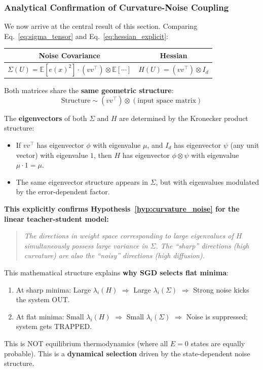 \documentclass[
  journal=largetwo,
  simfonts=false,
  year=2025,
  volume=37,
]{cup-journal}
\begin{document}
\subsubsection{Analytical Confirmation of Curvature-Noise Coupling}

We now arrive at the central result of this section. Comparing Eq.~\eqref{eq:sigma_tensor} and Eq.~\eqref{eq:hessian_explicit}:

\begin{center}
\begin{tabular}{|c|c|}
\hline
\textbf{Noise Covariance} & \textbf{Hessian} \\
\hline
$\Sigma(U) = \mathbb{E}[e(x)^2] \cdot (v v^\top) \otimes \mathbb{E}[\cdots]$ & $H(U) = (v v^\top) \otimes I_d$ \\
\hline
\end{tabular}
\end{center}

Both matrices share the \textbf{same geometric structure}:
\begin{equation}
    \text{Structure} \sim (v v^\top) \otimes (\text{input space matrix})
\end{equation}

The \textbf{eigenvectors} of both $\Sigma$ and $H$ are determined by the Kronecker product structure:
\begin{itemize}
    \item If $v v^\top$ has eigenvector $\phi$ with eigenvalue $\mu$, and $I_d$ has eigenvector $\psi$ (any unit vector) with eigenvalue $1$, then $H$ has eigenvector $\phi \otimes \psi$ with eigenvalue $\mu \cdot 1 = \mu$.
    \item The same eigenvector structure appears in $\Sigma$, but with eigenvalues modulated by the error-dependent factor.
\end{itemize}

\textbf{This explicitly confirms Hypothesis~\ref{hyp:curvature_noise} for the linear teacher-student model:}

\begin{quote}
    \textit{The directions in weight space corresponding to large eigenvalues of $H$ simultaneously possess large variance in $\Sigma$. The ``sharp'' directions (high curvature) are also the ``noisy'' directions (high diffusion).}
\end{quote}

\begin{remark}
This mathematical structure explains \textbf{why SGD selects flat minima}:
\begin{enumerate}
    \item At sharp minima: Large $\lambda_i(H)$ $\Rightarrow$ Large $\lambda_i(\Sigma)$ $\Rightarrow$ Strong noise kicks the system OUT.
    \item At flat minima: Small $\lambda_i(H)$ $\Rightarrow$ Small $\lambda_i(\Sigma)$ $\Rightarrow$ Noise is suppressed; system gets TRAPPED.
\end{enumerate}
This is NOT equilibrium thermodynamics (where all $E=0$ states are equally probable). This is a \textbf{dynamical selection} driven by the state-dependent noise structure.
\end{remark}
\end{document}

